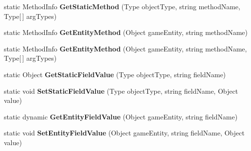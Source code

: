 \begin{DoxyCompactItemize}
\item 
\hypertarget{class_s_e_mod_a_p_i_internal_1_1_a_p_i_1_1_entity_1_1_base_object_a862f416b2abd3415faad692bb956b900}{}static Method\+Info {\bfseries Get\+Static\+Method} (Type object\+Type, string method\+Name, Type\mbox{[}$\,$\mbox{]} arg\+Types)\label{class_s_e_mod_a_p_i_internal_1_1_a_p_i_1_1_entity_1_1_base_object_a862f416b2abd3415faad692bb956b900}

\item 
\hypertarget{class_s_e_mod_a_p_i_internal_1_1_a_p_i_1_1_entity_1_1_base_object_aba520160a671b49d9c009a57e1d23d69}{}static Method\+Info {\bfseries Get\+Entity\+Method} (Object game\+Entity, string method\+Name)\label{class_s_e_mod_a_p_i_internal_1_1_a_p_i_1_1_entity_1_1_base_object_aba520160a671b49d9c009a57e1d23d69}

\item 
\hypertarget{class_s_e_mod_a_p_i_internal_1_1_a_p_i_1_1_entity_1_1_base_object_a0b6180e794940a858b41acece97de43c}{}static Method\+Info {\bfseries Get\+Entity\+Method} (Object game\+Entity, string method\+Name, Type\mbox{[}$\,$\mbox{]} arg\+Types)\label{class_s_e_mod_a_p_i_internal_1_1_a_p_i_1_1_entity_1_1_base_object_a0b6180e794940a858b41acece97de43c}

\item 
\hypertarget{class_s_e_mod_a_p_i_internal_1_1_a_p_i_1_1_entity_1_1_base_object_aa81ec237ff02fb47b98e3a2be0ae87cf}{}static Object {\bfseries Get\+Static\+Field\+Value} (Type object\+Type, string field\+Name)\label{class_s_e_mod_a_p_i_internal_1_1_a_p_i_1_1_entity_1_1_base_object_aa81ec237ff02fb47b98e3a2be0ae87cf}

\item 
\hypertarget{class_s_e_mod_a_p_i_internal_1_1_a_p_i_1_1_entity_1_1_base_object_ac905a2d2317761383e2fc15d19317633}{}static void {\bfseries Set\+Static\+Field\+Value} (Type object\+Type, string field\+Name, Object value)\label{class_s_e_mod_a_p_i_internal_1_1_a_p_i_1_1_entity_1_1_base_object_ac905a2d2317761383e2fc15d19317633}

\item 
\hypertarget{class_s_e_mod_a_p_i_internal_1_1_a_p_i_1_1_entity_1_1_base_object_a20b4487df06bfa05ef5f4d58efc6bf22}{}static dynamic {\bfseries Get\+Entity\+Field\+Value} (Object game\+Entity, string field\+Name)\label{class_s_e_mod_a_p_i_internal_1_1_a_p_i_1_1_entity_1_1_base_object_a20b4487df06bfa05ef5f4d58efc6bf22}

\item 
\hypertarget{class_s_e_mod_a_p_i_internal_1_1_a_p_i_1_1_entity_1_1_base_object_ab116af1b303891e0d67cf0dc8d87d0a9}{}static void {\bfseries Set\+Entity\+Field\+Value} (Object game\+Entity, string field\+Name, Object value)\label{class_s_e_mod_a_p_i_internal_1_1_a_p_i_1_1_entity_1_1_base_object_ab116af1b303891e0d67cf0dc8d87d0a9}


\end{DoxyCompactItemize}
